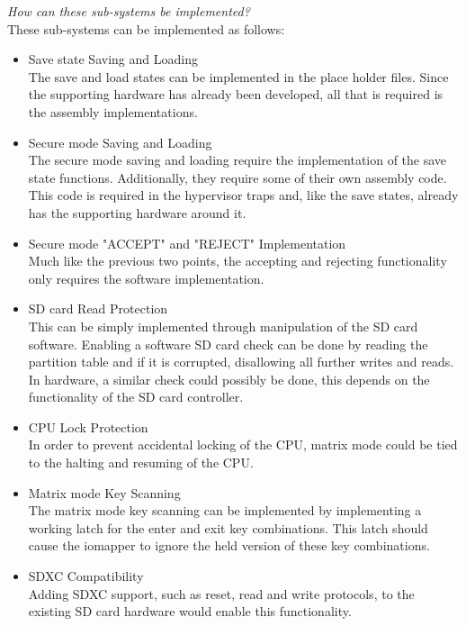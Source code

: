 \textit{How can these sub-systems be implemented?}\\
These sub-systems can be implemented as follows:
\begin{itemize}
\item{Save state Saving and Loading}\\
  The save and load states can be implemented in the place holder files. Since the supporting hardware has already been developed, all that is required is the assembly implementations.\\
\item{Secure mode Saving and Loading}\\
  The secure mode saving and loading require the implementation of the save state functions. Additionally, they require some of their own assembly code. This code is required in the hypervisor traps and, like the save states, already has the supporting hardware around it.\\
\item{Secure mode "ACCEPT" and "REJECT" Implementation}\\
  Much like the previous two points, the accepting and rejecting functionality only requires the software implementation.\\
\item{SD card Read Protection}\\
  This can be simply implemented through manipulation of the SD card software. Enabling a software SD card check can be done by reading the partition table and if it is corrupted, disallowing all further writes and reads. In hardware, a similar check could possibly be done, this depends on the functionality of the SD card controller.\\
\item{CPU Lock Protection}\\
  In order to prevent accidental locking of the CPU, matrix mode could be tied to the halting and resuming of the CPU.\\
\item{Matrix mode Key Scanning}\\
  The matrix mode key scanning can be implemented by implementing a working latch for the enter and exit key combinations. This latch should cause the iomapper to ignore the held version of these key combinations.\\
\item{SDXC Compatibility}\\
  Adding SDXC support, such as reset, read and write protocols, to the existing SD card hardware would enable this functionality.\\ 
\end{itemize}

